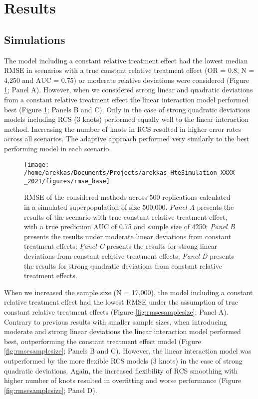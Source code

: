 \documentclass{article}
\begin{document}
\hypertarget{results}{%
\section{Results}\label{results}}

\hypertarget{simulations}{%
\subsection{Simulations}\label{simulations}}

The model including a constant relative treatment effect had the lowest
median RMSE in scenarios with a true constant relative treatment effect
(OR = 0.8, N = 4,250 and AUC = 0.75) or moderate relative deviations
were considered (Figure \ref{fig:rmsebase}; Panel A). However, when we
considered strong linear and quadratic deviations from a constant
relative treatment effect the linear interaction model performed best
(Figure \ref{fig:rmsebase}; Panels B and C). Only in the case of strong
quadratic deviations models including RCS (3 knots) performed equally
well to the linear interaction method. Increasing the number of knots in
RCS resulted in higher error rates across all scenarios. The adaptive
approach performed very similarly to the best performing model in each
scenario.

\begin{figure}
\texttt{[image: /home/arekkas/Documents/Projects/arekkas\_HteSimulation\_XXXX\_2021/figures/rmse\_base]} \caption{RMSE of the considered methods across 500 replications calculated in a simulated superpopulation of size 500,000. \textit{Panel A} presents the results of the scenario with true constant relative treatment effect, with a true prediction AUC of 0.75 and sample size of 4250; \textit{Panel B} presents the results under moderate linear deviations from constant treatment effects; \textit{Panel C} presents the results for strong linear deviations from constant relative treatment effects; \textit{Panel D} presents the results for strong quadratic deviations from constant relative treatment effects.}\label{fig:rmsebase}
\end{figure}

When we increased the sample size (N = 17,000), the model including a
constant relative treatment effect had the lowest RMSE under the
assumption of true constant relative treatment effects (Figure
\ref{fig:rmsesamplesize}; Panel A). Contrary to previous results with
smaller sample sizes, when introducing moderate and strong linear
deviations the linear interaction model performed best, outperforming
the constant treatment effect model (Figure \ref{fig:rmsesamplesize};
Panels B and C). However, the linear interaction model was outperformed
by the more flexible RCS models (3 knots) in the case of strong
quadratic deviations. Again, the increased flexibility of RCS smoothing
with higher number of knots resulted in overfitting and worse
performance (Figure \ref{fig:rmsesamplesize}; Panel D).
\end{document}
